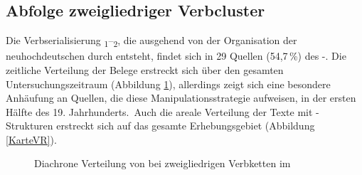  
 \subsection{Abfolge zweigliedriger Verbcluster}\label{vr}
   Die Verbserialisierung \textsubscript{1}–\textsubscript{2}, die ausgehend von der Organisation der neuhochdeutschen  durch \hai{{\VR}} entsteht, findet sich in 29 Quellen (54,7\,\%) des -. Die zeitliche Verteilung der Belege erstreckt sich über den gesamten Untersuchungszeitraum (Abbildung \ref{histoVR}), allerdings zeigt sich eine besondere Anhäufung an Quellen, die diese Manipulationsstrategie aufweisen, in der ersten Hälfte des 19. Jahrhunderts.\, Auch die areale Verteilung der Texte mit \hai{{\VR}}-Strukturen erstreckt sich auf das gesamte Erhebungsgebiet (Abbildung \ref{KarteVR}). 
    
    \begin{figure}
   \fittable{    
	\begin{tikzpicture}
		\begin{axis}[only marks, width=0.82\textwidth,height=0.2\textheight,
		legend style={at={(1,1)},xshift=+0.2cm, yshift=-0.02cm,anchor=north west,nodes=left},
			xtick={1700, 1725, 1750, 1775, 1800, 1825, 1850, 1875, 1900, 1925, 1950, 1975}, ytick=\empty,
			x tick label style={/pgf/number format/1000 sep=}, 
			y tick label style={/pgf/number format/1000 sep=},
			extra y tick style={grid=major,
				tick label style={, ,}},
				ymin=0.5,
				ymax=2.5,
			ylabel={Phänomenbelege},
			enlarge x limits=0.03]	
		



\addplot  [mark=square, black] table [x=jahr, y=vr] {figures/VR_vr.txt};%


\addplot [mark=o,black] table [x=jahr, y=no] {figures/VR_no.txt};%
 

						\legend{Abfolge \hai{V}\textsubscript{1}–\hai{V}\textsubscript{2} (\hai{{\VR}}), keine \hai{VR}} %
		\end{axis}
	\end{tikzpicture}	
	}
	\caption{Diachrone Verteilung von \hai{{\VR}} bei zweigliedrigen Verbketten im }
	\label{histoVR}	
\end{figure}

    

